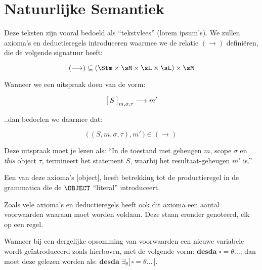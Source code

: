 
\chapter{Natuurlijke Semantiek}

Deze teksten zijn vooral bedoeld als ``tekstvlees'' (lorem ipsum's). We zullen axioma's en deductieregels introduceren waarmee we de relatie $(\longrightarrow)$ definiëren, die de volgende signatuur heeft:

$$ (\longrightarrow) \subseteq (\Stm \times \sM \times \sL \times \sL) \times \sM $$

Wanneer we een uitspraak doen van de vorm:

$$ \big[\,S\,\big]_{m,\sigma,\tau} \longrightarrow m' $$

..dan bedoelen we daarmee dat:

$$ \big(\,(S,m,\sigma,\tau), m'\,\big) \in (\longrightarrow) $$

Deze uitspraak moet je lezen als: ``In de toestand met geheugen $m$, scope $\sigma$ en \emph{this} object $\tau$, termineert het statement $S$, waarbij het resultaat-geheugen $m'$ is.''

Een van deze axioma's [object], heeft betrekking tot de productieregel in de grammatica die de $\OBJECT$ ``literal'' introduceert.


Zoals vele axioma's en deductieregels heeft ook dit axioma een aantal voorwaarden waaraan moet worden voldaan. Deze staan eronder genoteerd, elk op een regel.

Wanneer bij een dergelijke opsomming van voorwaarden een nieuwe variabele wordt geïntroduceerd zoals hierboven, met de volgende vorm: $\textbf{desda } \square = \theta \dots$; dan moet deze gelezen worden als: $\textbf{desda } \exists_\theta \big[\, \square = \theta \dots \,\big]$.

